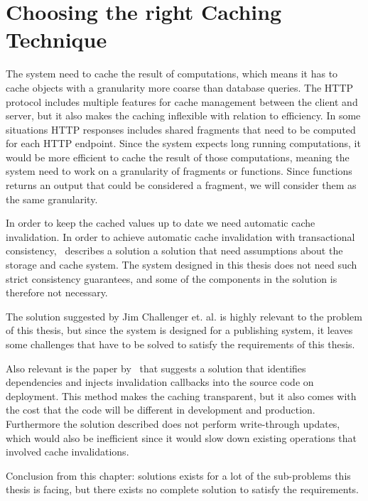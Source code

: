 
\section{Choosing the right Caching Technique}
\label{sec:choosing_the_right_caching_technique}





The system need to cache the result of computations, which means it has to cache objects with a granularity more coarse than database queries. The HTTP protocol includes multiple features for cache management between the client and server, but it also makes the caching inflexible with relation to efficiency. In some situations HTTP responses includes shared fragments that need to be computed for each HTTP endpoint. Since the system expects long running computations, it would be more efficient to cache the result of those computations, meaning the system need to work on a granularity of fragments or functions. Since functions returns an output that could be considered a fragment, we will consider them as the same granularity.

In order to keep the cached values up to date we need automatic cache invalidation. In order to achieve automatic cache invalidation with transactional consistency,~\cite{paper:liskov} describes a solution a solution that need assumptions about the storage and cache system. The system designed in this thesis does not need such strict consistency guarantees, and some of the components in the solution is therefore not necessary.

The solution suggested by Jim Challenger et. al. is highly relevant to the problem of this thesis, but since the system is designed for a publishing system, it leaves some challenges that have to be solved to satisfy the requirements of this thesis.

Also relevant is the paper by~\cite{paper:deploy-time} that suggests a solution that identifies dependencies and injects invalidation callbacks into the source code on deployment. This method makes the caching transparent, but it also comes with the cost that the code will be different in development and production. Furthermore the solution described does not perform write-through updates, which would also be inefficient since it would slow down existing operations that involved cache invalidations.

Conclusion from this chapter: solutions exists for a lot of the sub-problems this thesis is facing, but there exists no complete solution to satisfy the requirements.

